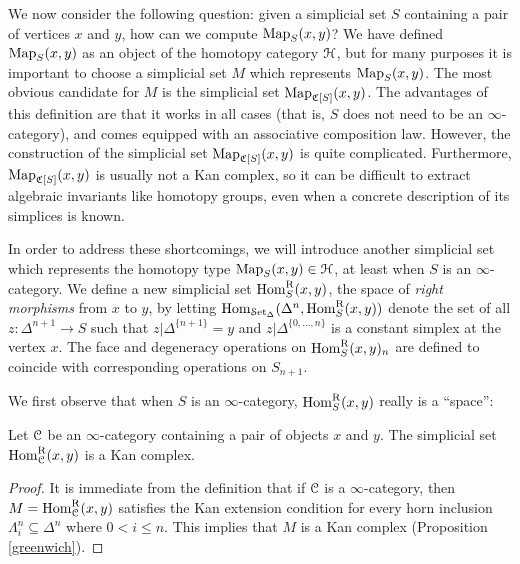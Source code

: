 \begin{1.2.2 Mapping spaces}
We now consider the following question: given a simplicial set $S$ containing a pair of vertices $x$ and $y$, how can we compute $\operatorname{{Map}}_{S}(x,y)$? We have defined
$\operatorname{{Map}}_{S}(x,y)$ as an object of the homotopy category $\operatorname{\mathcal{H}}$, but for many purposes it is important to choose a simplicial set $M$ which represents $\operatorname{{Map}}_{S}(x,y)$. 
The most obvious candidate for $M$ is the simplicial set
$\operatorname{{Map}}_{\operatorname{\mathfrak{C}}[S]}(x,y)$. The advantages of this definition are that it works in all cases (that is, $S$ does not need to be an $\infty$-category), and comes equipped with an associative composition law. However, the construction of the simplicial set
$\operatorname{{Map}}_{\operatorname{\mathfrak{C}}[S]}(x,y)$ is quite complicated. Furthermore,
$\operatorname{{Map}}_{\operatorname{\mathfrak{C}}[S]}(x,y)$ is usually not a Kan complex, so it
can be difficult to extract algebraic invariants like homotopy
groups, even when a concrete description of its simplices is known. 

In order to address these shortcomings, we will introduce another simplicial set which
represents the homotopy type $\operatorname{{Map}}_{S}(x,y) \in \operatorname{\mathcal{H}}$, at least when $S$ is an $\infty$-category. 
We define a new simplicial
set $\operatorname{Hom}^{\operatorname{R}}_S(x,y)$, the space of {\it right morphisms} from
$x$ to $y$, by letting $\operatorname{Hom}_{\operatorname{\mathcal{S}et_{\Delta}}}( \Delta^n, \operatorname{Hom}^{\operatorname{R}}_S(x,y))$ denote the set of
all $z: \Delta^{n+1} \rightarrow S$ such that $z| \Delta^{ \{n+1 \}} = y$ and $z|
\Delta^{ \{0, \ldots, n\} }$ is a constant simplex at the vertex
$x$. The face and degeneracy operations on
$\operatorname{Hom}^{\operatorname{R}}_S(x,y)_n$ are defined to coincide with corresponding operations on 
$S_{n+1}$.

We first observe that when $S$ is an $\infty$-category, $\operatorname{Hom}^{\operatorname{R}}_S(x,y)$ really is a ``space'':

\begin{proposition}\label{gura}
Let $\operatorname{\mathcal{C}}$ be an $\infty$-category containing a pair of objects $x$ and $y$. The simplicial set
$\operatorname{Hom}^{\operatorname{R}}_{\operatorname{\mathcal{C}}}(x,y)$ is a Kan complex.
\end{proposition}

\begin{proof}
It is immediate from the definition that if $\operatorname{\mathcal{C}}$ is a
$\infty$-category, then $M=\operatorname{Hom}^{\operatorname{R}}_{\operatorname{\mathcal{C}}}(x,y)$ satisfies the Kan
extension condition for every horn inclusion $\Lambda^n_i
\subseteq \Delta^n$ where $0 < i \leq n$. This implies that $M$ is
a Kan complex (Proposition \ref{greenwich}).
\end{proof}


\end{1.2.2 Mapping spaces}
